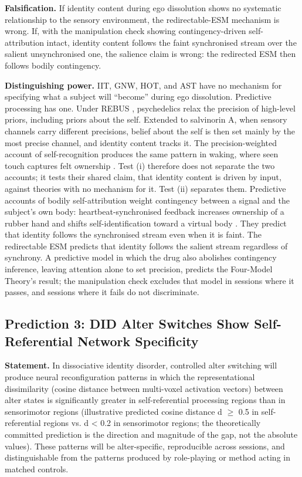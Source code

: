 \documentclass[12pt]{article}
\begin{document}
\textbf{Falsification.} If identity content during ego dissolution shows no systematic relationship to the sensory environment, the redirectable-ESM mechanism is wrong. If, with the manipulation check showing contingency-driven self-attribution intact, identity content follows the faint synchronised stream over the salient unsynchronised one, the salience claim is wrong: the redirected ESM then follows bodily contingency.

\textbf{Distinguishing power.} IIT, GNW, HOT, and AST have no mechanism for specifying what a subject will ``become'' during ego dissolution. Predictive processing has one. Under REBUS \citep{CarhartHarris2019}, psychedelics relax the precision of high-level priors, including priors about the self. Extended to salvinorin A, when sensory channels carry different precisions, belief about the self is then set mainly by the most precise channel, and identity content tracks it. The precision-weighted account of self-recognition \citep{AppsTsakiris2014} produces the same pattern in waking, where seen touch captures felt ownership \citep{Botvinick1998}. Test (i) therefore does not separate the two accounts; it tests their shared claim, that identity content is driven by input, against theories with no mechanism for it. Test (ii) separates them. Predictive accounts of bodily self-attribution weight contingency between a signal and the subject's own body: heartbeat-synchronised feedback increases ownership of a rubber hand and shifts self-identification toward a virtual body \citep{Suzuki2013,Aspell2013}. They predict that identity follows the synchronised stream even when it is faint. The redirectable ESM predicts that identity follows the salient stream regardless of synchrony. A predictive model in which the drug also abolishes contingency inference, leaving attention alone to set precision, predicts the Four-Model Theory's result; the manipulation check excludes that model in sessions where it passes, and sessions where it fails do not discriminate.


\subsection{Prediction 3: DID Alter Switches Show Self-Referential Network Specificity}


\textbf{Statement.} In dissociative identity disorder, controlled alter switching will produce neural reconfiguration patterns in which the representational dissimilarity (cosine distance between multi-voxel activation vectors) between alter states is significantly greater in self-referential processing regions than in sensorimotor regions (illustrative predicted cosine distance d $\geq$ 0.5 in self-referential regions vs. d < 0.2 in sensorimotor regions; the theoretically committed prediction is the direction and magnitude of the gap, not the absolute values). These patterns will be alter-specific, reproducible across sessions, and distinguishable from the patterns produced by role-playing or method acting in matched controls.
\end{document}
